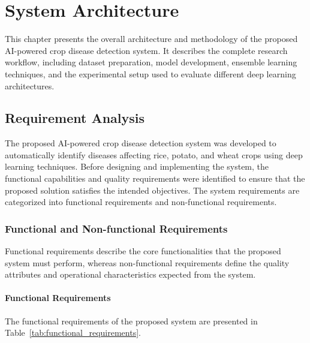 \chapter{System Architecture}

This chapter presents the overall architecture and methodology of the proposed AI-powered crop disease detection system. It describes the complete research workflow, including dataset preparation, model development, ensemble learning techniques, and the experimental setup used to evaluate different deep learning architectures.


\section{Requirement Analysis}

The proposed AI-powered crop disease detection system was developed to automatically identify diseases affecting rice, potato, and wheat crops using deep learning techniques. Before designing and implementing the system, the functional capabilities and quality requirements were identified to ensure that the proposed solution satisfies the intended objectives. The system requirements are categorized into functional requirements and non-functional requirements.

\subsection{Functional and Non-functional Requirements}

Functional requirements describe the core functionalities that the proposed system must perform, whereas non-functional requirements define the quality attributes and operational characteristics expected from the system.

\subsubsection{Functional Requirements}

The functional requirements of the proposed system are presented in Table~\ref{tab:functional_requirements}.

